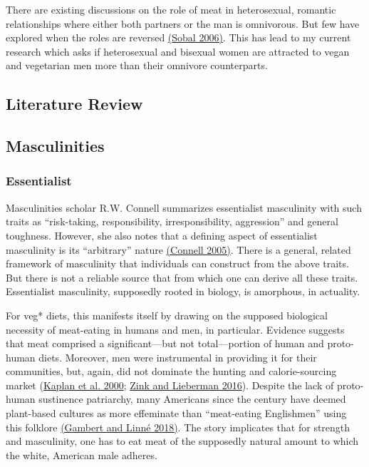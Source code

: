 \documentclass[twoside]{report}
\let\oldsection\section
\renewcommand\section{\clearpage\oldsection}
\begin{document}
There are existing discussions on the role of meat in heterosexual,
romantic relationships where either both partners or the man is
omnivorous. But few have explored when the roles are reversed \hyperlink{sobal}{(Sobal 2006)}. This has lead to my current research which asks if heterosexual and bisexual women are attracted to vegan and vegetarian men more than their omnivore counterparts.

\restoregeometry
\pagebreak

\pagestyle{fancy}
\fancyhf{}
\fancyfoot[LE,RO]{\thepage}
\begin{multicols*}{2}
\section{Literature Review}

\subsection{Masculinities}

\subsubsection{Essentialist}

Masculinities scholar R.W. Connell summarizes essentialist masculinity with such traits as ``risk-taking, responsibility, irresponsibility, aggression'' and general toughness. However, she also notes that a defining aspect of
essentialist masculinity is its ``arbitrary'' nature \hyperlink{connell}{(Connell 2005)}. There is a general, related framework of masculinity that individuals can construct from the above traits. But there is not a reliable source that from which one can derive all these traits. Essentialist masculinity, supposedly rooted in biology, is amorphous, in actuality.

For veg* diets, this manifests itself by drawing on the supposed
biological necessity of meat-eating in humans and men, in particular. Evidence suggests that meat comprised a significant---but not total---portion of human and proto-human diets. Moreover, men were instrumental in providing it for their communities, but, again, did not dominate the hunting and calorie-sourcing market (\hyperlink{kaplan}{Kaplan et al. 2000}; \hyperlink{zink}{Zink and Lieberman 2016}). Despite the lack of proto-human sustinence patriarchy, many Americans since the  century have deemed plant-based cultures as more effeminate than ``meat-eating Englishmen'' using this folklore \hyperlink{gambert}{(Gambert and Linné 2018)}. The story implicates that for strength and masculinity, one has to eat meat of the supposedly natural amount to which the white, American male adheres.


\end{multicols*}
\end{document}
